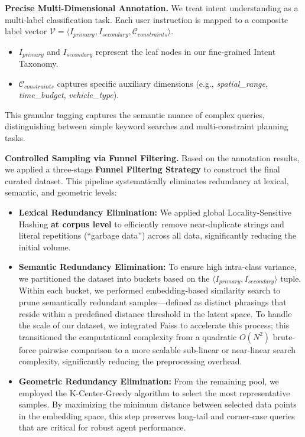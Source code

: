 \documentclass{article} %
\begin{document}
\textbf{Precise Multi-Dimensional Annotation.} We treat intent understanding as a multi-label classification task. Each user instruction is mapped to a composite label vector $\mathcal{V} = \langle I_{primary}, I_{secondary}, \mathcal{C}_{constraints} \rangle$.

\begin{itemize}
\item $I_{primary}$ and $I_{secondary}$ represent the leaf nodes in our fine-grained Intent Taxonomy.

\item $\mathcal{C}_{constraints}$ captures specific auxiliary dimensions (e.g., \textit{spatial\_range}, \textit{time\_budget}, \textit{vehicle\_type}).

\end{itemize}

This granular tagging captures the semantic nuance of complex queries, distinguishing between simple keyword searches and multi-constraint planning tasks.

\textbf{Controlled Sampling via Funnel Filtering.} 
Based on the annotation results, we applied a three-stage \textbf{Funnel Filtering Strategy} to construct the final curated dataset. This pipeline systematically eliminates redundancy at lexical, semantic, and geometric levels:
\begin{itemize}
    \item \textbf{Lexical Redundancy Elimination:} We applied global Locality-Sensitive Hashing \textbf{at corpus level} to efficiently remove near-duplicate strings and literal repetitions (``garbage data'') across all data, significantly reducing the initial volume.
    \item \textbf{Semantic Redundancy Elimination:} To ensure high intra-class variance, we partitioned the dataset into buckets based on the $\langle I_{primary}, I_{secondary} \rangle$ tuple. Within each bucket, we performed embedding-based similarity search to prune semantically redundant samples—defined as distinct phrasings that reside within a predefined distance threshold in the latent space. To handle the scale of our dataset, we integrated Faiss to accelerate this process; this transitioned the computational complexity from a quadratic $O(N^2)$ brute-force pairwise comparison to a more scalable sub-linear or near-linear search complexity, significantly reducing the preprocessing overhead.
    \item \textbf{Geometric Redundancy Elimination:} From the remaining pool, we employed the K-Center-Greedy algorithm to select the most representative samples. By maximizing the minimum distance between selected data points in the embedding space, this step preserves long-tail and corner-case queries that are critical for robust agent performance.
\end{itemize}
\end{document}
